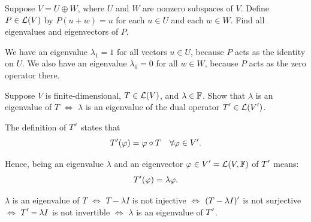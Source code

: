 \begin{xrcs}
  Suppose $V = U \oplus W$, where $U$ and $W$ are nonzero subspaces of $V$. Define $P \in \mathcal{L}(V)$ by $P(u+w) = u$ for each $u \in U$ and each $w \in W$. Find all eigenvalues and eigenvectors of $P$.

  \begin{xsol}
    We have an eigenvalue $\lambda_1 = 1$ for all vectors $u \in U$, because $P$ acts as the identity on $U$. We also have an eigenvalue $\lambda_0 = 0$ for all $w \in W$, because $P$ acts as the zero operator there.
  \end{xsol}
\end{xrcs}

\begin{xrcs}
  Suppose $V$ is finite-dimensional, $T \in \mathcal{L} (V)$, and $\lambda \in \mathbb{F}$. Show that $\lambda$ is an eigenvalue of $T$ $\iff$ $\lambda$ is an eigenvalue of the dual operator $\displaystyle T' \in \mathcal{L}(V')$.

  \begin{xsol}
    The definition of $\displaystyle T'$ states that
    \begin{equation}
      \displaystyle T'(\varphi) = \varphi \circ T \quad \forall \varphi \in \displaystyle V'.
    \end{equation}

    Hence, being an eigenvalue $\lambda$ and an eigenvector $\varphi \in \displaystyle V' = \mathcal{L}(V, \mathbb{F})$ of $\displaystyle T'$ means:
    \begin{equation}
      \displaystyle T'(\varphi) = \lambda \varphi.
    \end{equation}

    $\lambda$ is an eigenvalue of $T$ $\iff$ $T-\lambda I$ is not injective $\iff$ $\displaystyle (T-\lambda I)'$ is not surjective $\iff$ $\displaystyle T' - \lambda I$ is not invertible $\iff$ $\lambda$ is an eigenvalue of $\displaystyle T'$.
  \end{xsol}
\end{xrcs}


